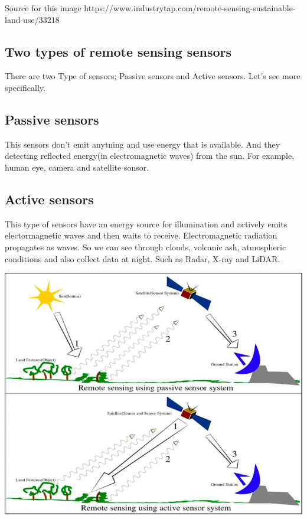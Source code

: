 \documentclass[
  letterpaper,
  DIV=11,
  numbers=noendperiod]{scrreprt}
\begin{document}
Source for this image
https://www.industrytap.com/remote-sensing-sustainable-land-use/33218

\hypertarget{two-types-of-remote-sensing-sensors}{%
\subsection{Two types of remote sensing
sensors}\label{two-types-of-remote-sensing-sensors}}

There are two Type of sensors; Passive sensors and Active sensors. Let's
see more specifically.

\hypertarget{passive-sensors}{%
\subsection{Passive sensors}\label{passive-sensors}}

This sensors don't emit anytning and use energy that is available. And
they detecting reflected energy(in electromagnetic waves) from the sun.
For example, human eye, camera and satellite sonsor.

\hypertarget{active-sensors}{%
\subsection{Active sensors}\label{active-sensors}}

This type of sensors have an energy source for illumination and actively
emits electormagnetic waves and then waits to receive. Electromagnetic
radiation propagates as waves. So we can see through clouds, volcanic
ash, atmospheric conditions and also collect data at night. Such as
Radar, X-ray and LiDAR.

\includegraphics{./images/paste-FF22A002.png}
\end{document}
